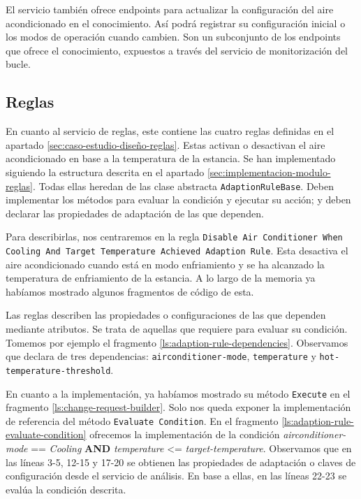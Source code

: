 El servicio también ofrece endpoints para actualizar la configuración del aire acondicionado en el conocimiento. Así podrá registrar su configuración inicial o los modos de operación cuando cambien. Son un subconjunto de los endpoints que ofrece el conocimiento, expuestos a través del servicio de monitorización del bucle.

\subsection{Reglas}

En cuanto al servicio de reglas, este contiene las cuatro reglas definidas en el apartado \ref{sec:caso-estudio-diseño-reglas}. Estas activan o desactivan el aire acondicionado en base a la temperatura de la estancia. Se han implementado siguiendo la estructura descrita en el apartado \ref{sec:implementacion-modulo-reglas}. Todas ellas heredan de las clase abstracta \texttt{AdaptionRuleBase}. Deben implementar los métodos para evaluar la condición y ejecutar su acción; y deben declarar las propiedades de adaptación de las que dependen.

Para describirlas, nos centraremos en la regla \texttt{Disable Air Conditioner When Cooling And Target Temperature Achieved Adaption Rule}. Esta desactiva el aire acondicionado cuando está en modo enfriamiento y se ha alcanzado la temperatura de enfriamiento de la estancia. A lo largo de la memoria ya habíamos mostrado algunos fragmentos de código de esta.

Las reglas describen las propiedades o configuraciones de las que dependen mediante atributos. Se trata de aquellas que requiere para evaluar su condición. Tomemos por ejemplo el fragmento \ref{ls:adaption-rule-dependencies}. Observamos que declara de tres dependencias: \texttt{airconditioner-mode}, \texttt{temperature} y \texttt{hot-temperature-threshold}.

En cuanto a la implementación, ya habíamos mostrado su método \texttt{Execute} en el fragmento \ref{ls:change-request-builder}. Solo nos queda exponer la implementación de referencia del método \texttt{Evaluate Condition}. En el fragmento \ref{ls:adaption-rule-evaluate-condition} ofrecemos la implementación de la condición \emph{airconditioner-mode} == \emph{Cooling} \textbf{AND} \emph{temperature} <= \emph{target-temperature}. Observamos que en las líneas 3-5, 12-15 y 17-20 se obtienen las propiedades de adaptación o claves de configuración desde el servicio de análisis. En base a ellas, en las líneas 22-23 se evalúa la condición descrita.

